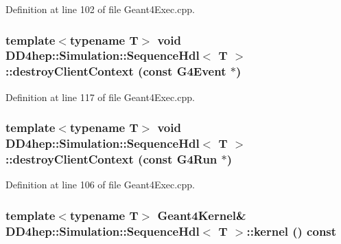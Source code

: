 Definition at line 102 of file Geant4Exec.cpp.\hypertarget{class_d_d4hep_1_1_simulation_1_1_sequence_hdl_a8134448bdd2dd9d0e2f5d5834aa6a60f}{
\subsubsection[{destroyClientContext}]{\setlength{\rightskip}{0pt plus 5cm}template$<$typename T$>$ void {\bf DD4hep::Simulation::SequenceHdl}$<$ {\bf T} $>$::destroyClientContext (const G4Event $\ast$)}}
\label{class_d_d4hep_1_1_simulation_1_1_sequence_hdl_a8134448bdd2dd9d0e2f5d5834aa6a60f}


Definition at line 117 of file Geant4Exec.cpp.\hypertarget{class_d_d4hep_1_1_simulation_1_1_sequence_hdl_a0f4ca2107e2527947620c788fe60bc9a}{
\subsubsection[{destroyClientContext}]{\setlength{\rightskip}{0pt plus 5cm}template$<$typename T$>$ void {\bf DD4hep::Simulation::SequenceHdl}$<$ {\bf T} $>$::destroyClientContext (const G4Run $\ast$)}}
\label{class_d_d4hep_1_1_simulation_1_1_sequence_hdl_a0f4ca2107e2527947620c788fe60bc9a}


Definition at line 106 of file Geant4Exec.cpp.\hypertarget{class_d_d4hep_1_1_simulation_1_1_sequence_hdl_a642b7c9a8d35ba43e92bb33b7198bcc5}{
\subsubsection[{kernel}]{\setlength{\rightskip}{0pt plus 5cm}template$<$typename T$>$ {\bf Geant4Kernel}\& {\bf DD4hep::Simulation::SequenceHdl}$<$ {\bf T} $>$::kernel () const}}
\label{class_d_d4hep_1_1_simulation_1_1_sequence_hdl_a642b7c9a8d35ba43e92bb33b7198bcc5}


